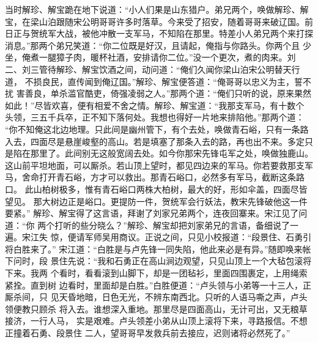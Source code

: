 当时解珍、解宝跪在地下说道：“小人们果是山东猎户。弟兄两个，唤做解珍、解
宝，在梁山泊跟随宋公明哥哥许多时落草。今来受了招安，随着哥哥来破辽国。前
日正与贺统军大战，被他冲散一支军马，不知陷在那里。特差小人弟兄两个来打探
消息。”那两个弟兄笑道：“你二位既是好汉，且请起，俺指与你路头。你两个且
少坐，俺煮一腿獐子肉，暖杯社酒，安排请你二位。”没一个更次，煮的肉来。刘
二、刘三管待解珍、解宝饮酒之间，动问道：“俺们久闻你梁山泊宋公明替天行道，
不损良民，直传闻到俺辽国。”解珍、解宝便答道：“俺哥哥以忠义为主，誓不扰
害善良，单杀滥官酷吏，倚强凌弱之人。”那两个道：“俺们只听的说，原来果然
如此！”尽皆欢喜，便有相爱不舍之情。解珍、解宝道：“我那支军马，有十数个
头领，三五千兵卒，正不知下落何处。我想也得好一片地来排陷他。”那两个道：
“你不知俺这北边地理。只此间是幽州管下，有个去处，唤做青石峪，只有一条路
入去，四面尽是悬崖峻壑的高山。若是填塞了那条入去的路，再也出不来。多定只
是陷在那里了。此间别无这般宽阔去处。如今你那宋先锋屯军之处，唤做独鹿山。
这山前平坦地面，可以厮杀。若山顶上望时，都见四边来的军马。你若要救那支军
马，舍命打开青石峪，方才可以救出。那青石峪口，必然多有军马，截断这条路口。
此山柏树极多，惟有青石峪口两株大柏树，最大的好，形如伞盖，四面尽皆望见。
那大树边正是峪口。更提防一件，贺统军会行妖法，教宋先锋破他这一件要紧。”
解珍、解宝得了这言语，拜谢了刘家兄弟两个，连夜回寨来。宋江见了问道：“你
两个打听的些分晓么？”解珍、解宝却把刘家弟兄的言语，备细说了一遍。宋江失
惊，便请军师吴用商议。正说之间，只见小校报道：“段景住、石勇引将白胜来了。”
宋江道：“白胜是与卢先锋一同失陷，他此来必是有异。”随即唤来帐下问时，段
景住先说：“我和石勇正在高山涧边观望，只见山顶上一个大毡包滚将下来。我两
个看时，看看滚到山脚下，却是一团毡衫，里面四围裹定，上用绳索紧拴。直到树
边看时，里面却是白胜。”白胜便道：“卢头领与小弟等一十三人，正厮杀间，只
见天昏地暗，日色无光，不辨东南西北。只听的人语马嘶之声，卢头领便教只顾杀
将入去。谁想深入重地。那里尽是四面高山，无计可出，又无粮草接济，一行人马，
实是艰难。卢头领差小弟从山顶上滚将下来，寻路报信。不想正撞着石勇、段景住
二人，望哥哥早发救兵前去接应，迟则诸将必然死了。”

